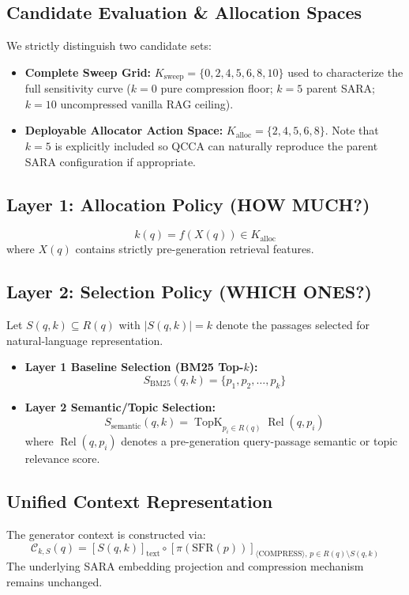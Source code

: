 \documentclass[11pt,a4paper]{article}
\begin{document}
\subsection{Candidate Evaluation \& Allocation Spaces}
We strictly distinguish two candidate sets:
\begin{itemize}
    \item \textbf{Complete Sweep Grid:} $K_{\text{sweep}} = \{0, 2, 4, 5, 6, 8, 10\}$ used to characterize the full sensitivity curve ($k=0$ pure compression floor; $k=5$ parent SARA; $k=10$ uncompressed vanilla RAG ceiling).
    \item \textbf{Deployable Allocator Action Space:} $K_{\text{alloc}} = \{2, 4, 5, 6, 8\}$. Note that $k=5$ is explicitly included so QCCA can naturally reproduce the parent SARA configuration if appropriate.
\end{itemize}

\subsection{Layer 1: Allocation Policy (HOW MUCH?)}
\begin{equation}
k(q) = f(X(q)) \in K_{\text{alloc}}
\end{equation}
where $X(q)$ contains strictly pre-generation retrieval features.

\subsection{Layer 2: Selection Policy (WHICH ONES?)}
Let $S(q, k) \subseteq R(q)$ with $|S(q, k)| = k$ denote the passages selected for natural-language representation.
\begin{itemize}
    \item \textbf{Layer 1 Baseline Selection (BM25 Top-$k$):}
    \begin{equation}
    S_{\text{BM25}}(q, k) = \{p_1, p_2, \dots, p_k\}
    \end{equation}
    \item \textbf{Layer 2 Semantic/Topic Selection:}
    \begin{equation}
    S_{\text{semantic}}(q, k) = \operatorname{TopK}_{p_i \in R(q)} \operatorname{Rel}(q, p_i)
    \end{equation}
    where $\operatorname{Rel}(q, p_i)$ denotes a pre-generation query-passage semantic or topic relevance score.
\end{itemize}

\subsection{Unified Context Representation}
The generator context is constructed via:
\begin{equation}
\mathcal{C}_{k, S}(q) = \left[ S(q, k) \right]_{\text{text}} \circ \left[ \pi(\text{SFR}(p)) \right]_{\langle\text{COMPRESS}\rangle, \, p \in R(q) \setminus S(q, k)}
\end{equation}
The underlying SARA embedding projection and compression mechanism remains unchanged.
\end{document}
